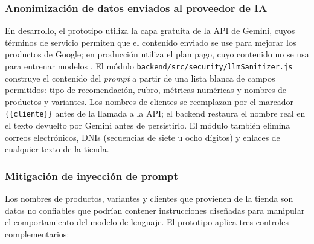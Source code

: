 \subsubsection{Anonimización de datos enviados al proveedor de IA}
\label{sec:anonimizacion-llm}

En desarrollo, el prototipo utiliza la capa gratuita de la API de Gemini, cuyos términos de servicio permiten que el contenido enviado se use para mejorar los productos de Google; en producción utiliza el plan pago, cuyo contenido no se usa para entrenar modelos \parencite{GoogleGeminiTerms2026}. El módulo \texttt{backend/src/security/llmSanitizer.js} construye el contenido del \emph{prompt} a partir de una lista blanca de campos permitidos: tipo de recomendación, rubro, métricas numéricas y nombres de productos y variantes. Los nombres de clientes se reemplazan por el marcador \texttt{\{\{cliente\}\}} antes de la llamada a la API; el backend restaura el nombre real en el texto devuelto por Gemini antes de persistirlo. El módulo también elimina correos electrónicos, DNIs (secuencias de siete u ocho dígitos) y enlaces de cualquier texto de la tienda.

\subsubsection{Mitigación de inyección de prompt}
\label{sec:prompt-injection}

Los nombres de productos, variantes y clientes que provienen de la tienda son datos no confiables que podrían contener instrucciones diseñadas para manipular el comportamiento del modelo de lenguaje. El prototipo aplica tres controles complementarios:

